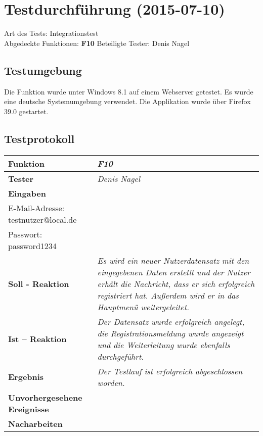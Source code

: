 
\chapter{Testdurchführung (2015-07-10)}

Art des Tests: Integrationstest\\
Abgedeckte Funktionen: \textbf{F10}
Beteiligte Tester: Denis Nagel\\

\section{Testumgebung}

Die Funktion wurde unter Windows 8.1 auf einem Webserver  getestet. Es wurde eine deutsche Systemumgebung verwendet. Die Applikation wurde über Firefox 39.0 gestartet.

\section{Testprotokoll}

\begin{longtable}{|p{4cm}|p{11cm}|}
\hline
\textbf{Funktion} & \textit{\textbf{F10}} \\
\hline
\textbf{Tester} & \textit{Denis Nagel} \\
\hline
\textbf{Eingaben} & \textit{Username: Testnutzer\\
E-Mail-Adresse: testnutzer@local.de\\
Passwort: password1234} \\
\hline
\textbf{Soll - Reaktion} & \textit{Es wird ein neuer Nutzerdatensatz mit den eingegebenen Daten erstellt und der Nutzer erhält die Nachricht, dass er sich erfolgreich registriert hat. Außerdem wird er in das Hauptmenü weitergeleitet.} \\
\hline
\textbf{Ist -- Reaktion} & \textit{Der Datensatz wurde erfolgreich angelegt, die Registrationsmeldung wurde angezeigt und die Weiterleitung wurde ebenfalls durchgeführt.} \\
\hline
\textbf{Ergebnis} & \textit{Der Testlauf ist erfolgreich abgeschlossen worden.} \\
\hline
\textbf{Unvorhergesehene Ereignisse} &
\textit{} \\
\hline
\textbf{Nacharbeiten } & \textit{} \\
\hline
\end{longtable}

